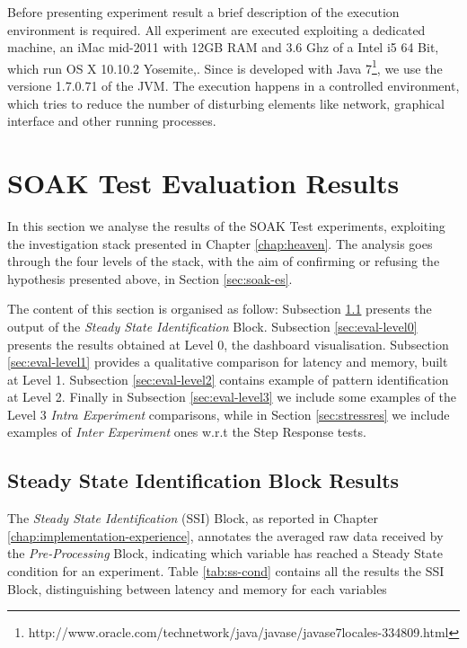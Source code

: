 Before presenting experiment result a brief description of the execution environment is required. All experiment are executed exploiting a dedicated machine, an iMac mid-2011 with 12GB RAM and 3.6 Ghz of a Intel i5 64 Bit, which run OS X 10.10.2 Yosemite,. Since \name is developed with Java 7\footnote{http://www.oracle.com/technetwork/java/javase/javase7locales-334809.html}, we use the versione 1.7.0.71 of the JVM.
The execution happens in a controlled environment, which tries to reduce the number of disturbing elements like network, graphical interface and other running processes.

\section{SOAK Test Evaluation Results}\label{sec:soakres}

In this section we analyse the results of the SOAK Test experiments, exploiting the investigation stack presented in Chapter \ref{chap:heaven}. The analysis goes through the four levels of the stack, with the aim of confirming or refusing the hypothesis presented above, in Section \ref{sec:soak-es}. 

The content of this section is organised as follow: 
Subsection \ref{sec:eval-ssib} presents the output of the \textit{Steady State Identification} Block. 
Subsection \ref{sec:eval-level0} presents the results obtained at Level 0, the dashboard visualisation.  
Subsection \ref{sec:eval-level1} provides a qualitative comparison for latency and memory, built at Level 1. 
Subsection \ref{sec:eval-level2} contains example of pattern identification at Level 2. 
Finally in Subsection \ref{sec:eval-level3} we include some examples of the Level 3 \textit{Intra Experiment }comparisons, while in Section \ref{sec:stressres} we include examples of \textit{Inter Experiment }ones w.r.t the Step Response tests.


\subsection{Steady State Identification Block Results}\label{sec:eval-ssib}

The \textit{Steady State Identification} (SSI) Block, as reported in Chapter \ref{chap:implementation-experience}, annotates the averaged raw data received by the \textit{Pre-Processing} Block, indicating which variable has reached a Steady State condition for an experiment. Table \ref{tab:ss-cond} contains all the results the SSI Block, distinguishing between latency and memory for each variables


